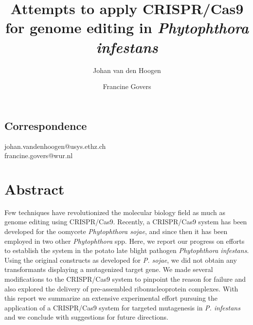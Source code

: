 \documentclass[onecolumn, 11pt,openany]{memoir}
\begin{document}
\thispagestyle{empty}                   
\frontmatter

\title{Attempts to apply CRISPR/Cas9 for genome editing in \textit{Phytophthora infestans}}
\author[1,2]{Johan van den Hoogen}
\author[1]{Francine Govers}
\begin{scriptsize}
\end{scriptsize}
\date{\vspace{-5ex}}
\maketitle

\subsection{Correspondence}
johan.vandenhoogen@usys.ethz.ch\\
francine.govers@wur.nl

\pagestyle{plain}

\section{Abstract}
Few techniques have revolutionized the molecular biology field as much as genome editing using CRISPR/Cas9. Recently, a CRISPR/Cas9 system has been developed for the oomycete \textit{Phytophthora sojae}, and since then it has been employed in two other \textit{Phytophthora} spp. Here, we report our progress on efforts to establish the system in the potato late blight pathogen \textit{Phytophthora infestans}. Using the original constructs as developed for \textit{P. sojae}, we did not obtain any transformants displaying a mutagenized target gene. We made several modifications to the CRISPR/Cas9 system to pinpoint the reason for failure and also explored the delivery of pre-assembled ribonucleoprotein complexes. With this report we summarize an extensive experimental effort pursuing the application of a CRISPR/Cas9 system for targeted mutagenesis in \textit{P. infestans} and we conclude with suggestions for future directions.
\end{document}
